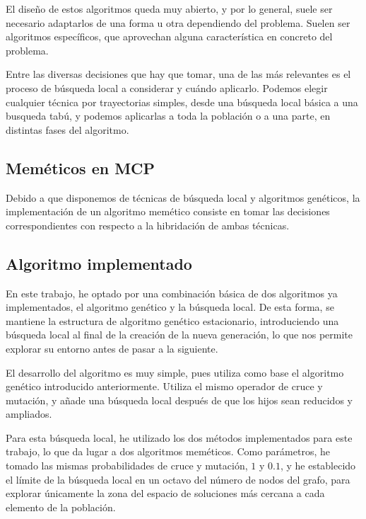 El diseño de estos algoritmos queda muy abierto, y por lo general, suele ser necesario
adaptarlos de una forma u otra dependiendo del problema. Suelen ser algoritmos específicos,
que aprovechan alguna característica en concreto del problema.

Entre las diversas decisiones que hay que tomar, una de las más relevantes es el
proceso de búsqueda local a considerar y cuándo aplicarlo. Podemos elegir cualquier
técnica por trayectorias simples, desde una búsqueda local básica a una busqueda
tabú, y podemos aplicarlas a toda la población o a una parte, en distintas
fases del algoritmo.

\subsection{Meméticos en MCP}

Debido a que disponemos de técnicas de búsqueda local y algoritmos genéticos, la
implementación de un algoritmo memético consiste en tomar las decisiones correspondientes
con respecto a la hibridación de ambas técnicas.

\subsection{Algoritmo implementado}

En este trabajo, he optado por una combinación básica de dos algoritmos ya implementados,
el algoritmo genético y la búsqueda local. De esta forma, se mantiene la estructura
de algoritmo genético estacionario, introduciendo una búsqueda local al final de
la creación de la nueva generación, lo que nos permite explorar su entorno antes de
pasar a la siguiente.

El desarrollo del algoritmo es muy simple, pues utiliza como base el algoritmo
genético introducido anteriormente. Utiliza el mismo operador de cruce y mutación,
y añade una búsqueda local después de que los hijos sean reducidos y ampliados.

Para esta búsqueda local, he utilizado los dos métodos implementados para este trabajo,
lo que da lugar a dos algoritmos meméticos. Como parámetros, he tomado las mismas
probabilidades de cruce y mutación, $1$ y $0.1$, y he establecido el límite de la
búsqueda local en un octavo del número de nodos del grafo, para explorar únicamente
la zona del espacio de soluciones más cercana a cada elemento de la población.  
